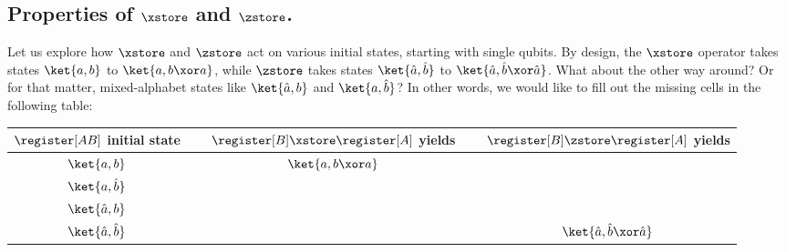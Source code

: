   \subsection{Properties of $\xstore$ and $\zstore$.}
    Let us explore how $\xstore$ and $\zstore$ act on various initial states,
      starting with single qubits.
      By design, the $\xstore$ operator takes states $\ket{a, b}$ to
      $\ket{a, b \xor a}$, while 
      $\zstore$ takes states $\ket{\hat a, \hat b}$ to 
      $\ket{\hat a, \hat b \xor \hat a}$. 
      What about the other way around?
      Or for that matter, mixed-alphabet states like $\ket{\hat a, b}$ and
      $\ket{a, \hat b}$? 
      In other words, we would like to fill out the missing
      cells in the following table:

    \begin{steptable}
      \setlength{\extrarowheight}{2pt}
      \begin{tabular}{ccc}
          \toprule
          $\register[AB]$ initial state & 
            $\quad$ $\register[B] \xstore \register[A]$ yields $\quad$ & 
            $\register[B] \zstore \register[A]$ yields\\
          \midrule
          $\ket{a,b}$ & $\ket{a,b \xor a}$ & \\
          $\ket{a,\hat b}$ &  &  \\
          $\ket{\hat a, b}$ &  &  \\
          $\ket{\hat a, \hat b}$ &  & $\ket{\hat a, \hat b \xor \hat a}$ \\
          \bottomrule
        \end{tabular}
    \end{steptable}

